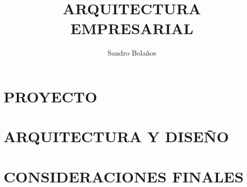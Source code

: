 \documentclass[11pt,letterpaper]{book}
\title{ARQUITECTURA EMPRESARIAL}
\author{Sandro Bolaños}
\begin{document}
\maketitle
\tableofcontents
\listoffigures	
	
\part{PROYECTO}
\part{ARQUITECTURA Y DISEÑO}











\part{CONSIDERACIONES FINALES}



\appendix

\end{document}
